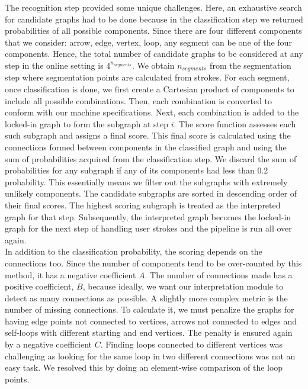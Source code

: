 The recognition step provided some unique challenges. Here, an exhaustive search for candidate graphs had to be done because in the classification step we returned probabilities of all possible components. Since there are four different components that we consider: arrow, edge, vertex, loop, any segment can be one of the four components. Hence, the total number of candidate graphs to be considered at any step in the online setting is $4^{n_{segments}}$. We obtain $n_{segments}$ from the segmentation step where segmentation points are calculated from strokes. For each segment, once classification is done, we first create a Cartesian product of components to include all possible combinations. Then, each combination is converted to conform with our machine specifications. Next, each combination is added to the locked-in graph to form the subgraph at step $i$. The score function assesses each such subgraph and assigns a final score. This final score is calculated using the connections formed between components in the classified graph and using the sum of probabilities acquired from the classification step. We discard the sum of probabilities for any subgraph if any of its components had less than 0.2 probability. This essentially means we filter out the subgraphs with extremely unlikely components. The candidate subgraphs are sorted in descending order of their final scores. The highest scoring subgraph is treated as the interpreted graph for that step. Subsequently, the interpreted graph becomes the locked-in graph for the next step of handling user strokes and the pipeline is run all over again.\\

In addition to the classification probability, the scoring depends on the connections too. Since the number of components tend to be over-counted by this method, it has a negative coefficient $A$. The number of connections made has a positive coefficient, $B$, because ideally, we want our interpretation module to detect as many connections as possible. A slightly more complex metric is the number of missing connections. To calculate it, we must penalize the graphs for having edge points not connected to vertices, arrows not connected to edges and self-loops with different starting and end vertices. The penalty is ensured again by a negative coefficient $C$. Finding loops connected to different vertices was challenging as looking for the same loop in two different connections was not an easy task. We resolved this by doing an element-wise comparison of the loop points.\\

